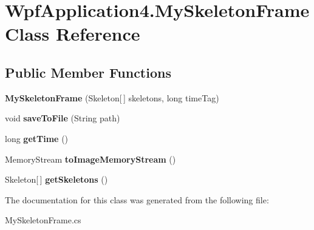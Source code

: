 \hypertarget{class_wpf_application4_1_1_my_skeleton_frame}{\section{Wpf\-Application4.\-My\-Skeleton\-Frame Class Reference}
\label{class_wpf_application4_1_1_my_skeleton_frame}
}
\subsection*{Public Member Functions}
\begin{DoxyCompactItemize}
\item 
\hypertarget{class_wpf_application4_1_1_my_skeleton_frame_a1453f478ad80e1bac12d41b4cff8add7}{{\bfseries My\-Skeleton\-Frame} (Skeleton\mbox{[}$\,$\mbox{]} skeletons, long time\-Tag)}\label{class_wpf_application4_1_1_my_skeleton_frame_a1453f478ad80e1bac12d41b4cff8add7}

\item 
\hypertarget{class_wpf_application4_1_1_my_skeleton_frame_a39ee72ae3bd0b6e54b0d78d4604ee822}{void {\bfseries save\-To\-File} (String path)}\label{class_wpf_application4_1_1_my_skeleton_frame_a39ee72ae3bd0b6e54b0d78d4604ee822}

\item 
\hypertarget{class_wpf_application4_1_1_my_skeleton_frame_afd42495009796834ee8689899740798d}{long {\bfseries get\-Time} ()}\label{class_wpf_application4_1_1_my_skeleton_frame_afd42495009796834ee8689899740798d}

\item 
\hypertarget{class_wpf_application4_1_1_my_skeleton_frame_a1182a730bb79ef8c47dbcbced65beff0}{Memory\-Stream {\bfseries to\-Image\-Memory\-Stream} ()}\label{class_wpf_application4_1_1_my_skeleton_frame_a1182a730bb79ef8c47dbcbced65beff0}

\item 
\hypertarget{class_wpf_application4_1_1_my_skeleton_frame_ad9b85206d453ec8b6ac9d9fe6fbcbd43}{Skeleton\mbox{[}$\,$\mbox{]} {\bfseries get\-Skeletons} ()}\label{class_wpf_application4_1_1_my_skeleton_frame_ad9b85206d453ec8b6ac9d9fe6fbcbd43}

\end{DoxyCompactItemize}


The documentation for this class was generated from the following file\-:\begin{DoxyCompactItemize}
\item 
My\-Skeleton\-Frame.\-cs\end{DoxyCompactItemize}
